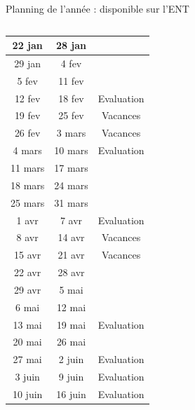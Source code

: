 \documentclass [xcolor=x11names,t] {beamer}
\begin{document}
\begin{frame}{Planning de l'année : disponible sur l'ENT}
\begin{minipage}{0.45\textwidth}
\begin{tabular}{|c|c|c|}
\end{tabular}
\end{minipage}\hfill
\begin{minipage}{0.45\textwidth}
\begin{tabular}{|c|c|c|}\hline
     22 jan& 28 jan&  \\ \hline
     29 jan& 4 fev &  \\ \hline
     5 fev & 11 fev& \\ \hline
     \cellcolor{red!30}12 fev & \cellcolor{red!30}18 fev&\cellcolor{red!30} Evaluation \\ \hline
     \cellcolor{green!30}19 fev & \cellcolor{green!30}25 fev& \cellcolor{green!30}Vacances \\ \hline
     \cellcolor{green!30}26 fev & \cellcolor{green!30}3 mars&  \cellcolor{green!30}Vacances \\ \hline
      \cellcolor{red!30}4 mars&  \cellcolor{red!30}10 mars&\cellcolor{red!30}  Evaluation\\ \hline
     11 mars&  17 mars&  \\ \hline
     18 mars&  24 mars&  \\ \hline
     25 mars&  31 mars&  \\ \hline
    \cellcolor{red!30} 1 avr&\cellcolor{red!30} 7 avr& \cellcolor{red!30} Evaluation\\ \hline
     \cellcolor{green!30}8 avr&\cellcolor{green!30} 14 avr& \cellcolor{green!30} Vacances\\ \hline
     \cellcolor{green!30}15 avr& \cellcolor{green!30}21 avr&\cellcolor{green!30} Vacances \\ \hline
     22 avr& 28 avr&  \\ \hline
     29 avr& 5 mai&  \\ \hline
     6 mai& 12 mai&  \\ \hline
     \cellcolor{red!30}13 mai&\cellcolor{red!30} 19 mai& \cellcolor{red!30} Evaluation\\ \hline
     20 mai& 26 mai&  \\ \hline
     \cellcolor{red!30}27 mai& \cellcolor{red!30}2 juin&  \cellcolor{red!30}Evaluation\\ \hline
     \cellcolor{red!30}3 juin& \cellcolor{red!30}9 juin& \cellcolor{red!30}Evaluation\\ \hline
     \cellcolor{red!30}10 juin& \cellcolor{red!30}16 juin&\cellcolor{red!30} Evaluation\\ \hline
\end{tabular}
\end{minipage}
\end{frame}
\end{document}
